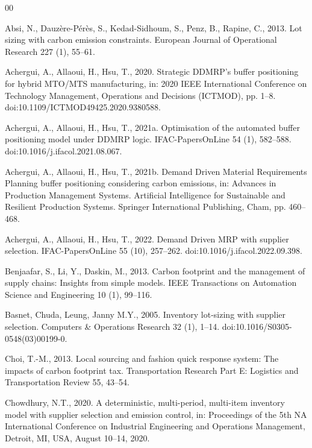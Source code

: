 \documentclass[preprint,12pt,authoryear]{elsarticle}
\begin{document}
\begin{thebibliography}{00}

Absi, N., Dauz\`ere-P\'er\`es, S., Kedad-Sidhoum, S., Penz, B., Rapine, C., 2013.
Lot sizing with carbon emission constraints. European Journal of Operational
Research 227 (1), 55--61.

Achergui, A., Allaoui, H., Hsu, T., 2020. Strategic DDMRP's buffer positioning for
hybrid MTO/MTS manufacturing, in: 2020 IEEE International Conference on Technology
Management, Operations and Decisions (ICTMOD), pp. 1--8.
doi:10.1109/ICTMOD49425.2020.9380588.

Achergui, A., Allaoui, H., Hsu, T., 2021a. Optimisation of the automated buffer
positioning model under DDMRP logic. IFAC-PapersOnLine 54 (1), 582--588.
doi:10.1016/j.ifacol.2021.08.067.

Achergui, A., Allaoui, H., Hsu, T., 2021b. Demand Driven Material Requirements Planning
buffer positioning considering carbon emissions, in: Advances in Production Management
Systems. Artificial Intelligence for Sustainable and Resilient Production Systems.
Springer International Publishing, Cham, pp. 460--468.

Achergui, A., Allaoui, H., Hsu, T., 2022. Demand Driven MRP with supplier selection.
IFAC-PapersOnLine 55 (10), 257--262. doi:10.1016/j.ifacol.2022.09.398.

Benjaafar, S., Li, Y., Daskin, M., 2013. Carbon footprint and the management of
supply chains: Insights from simple models. IEEE Transactions on Automation Science
and Engineering 10 (1), 99--116.

Basnet, Chuda, Leung, Janny M.Y., 2005. Inventory lot-sizing with supplier selection.
Computers \& Operations Research 32 (1), 1--14. doi:10.1016/S0305-0548(03)00199-0.

Choi, T.-M., 2013. Local sourcing and fashion quick response system: The impacts of
carbon footprint tax. Transportation Research Part E: Logistics and Transportation
Review 55, 43--54.

Chowdhury, N.T., 2020. A deterministic, multi-period, multi-item inventory model with
supplier selection and emission control, in: Proceedings of the 5th NA International
Conference on Industrial Engineering and Operations Management, Detroit, MI, USA,
August 10--14, 2020.


\end{thebibliography}
\end{document}
